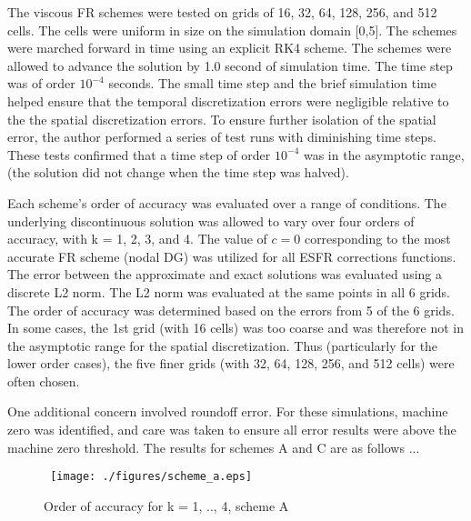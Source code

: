 \vspace{0.1 in}
\noindent The viscous FR schemes were tested on grids of 16, 32, 64, 128, 256, and 512 cells. The cells were uniform in size on the simulation domain [0,5]. The schemes were marched forward in time using an explicit RK4 scheme. The schemes were allowed to advance the solution by 1.0 second of simulation time. The time step was of order \begin{math} 10^{-4} \end{math} seconds. The small time step and the brief simulation time helped ensure that the temporal discretization errors were negligible relative to the the spatial discretization errors. To ensure further isolation of the spatial error, the author performed a series of test runs with diminishing time steps. These tests confirmed that a time step of order \begin{math} 10^{-4} \end{math} was in the asymptotic range, (the solution did not change when the time step was halved). 

\vspace{0.1 in}

\noindent Each scheme's order of accuracy was evaluated over a range of conditions. The underlying discontinuous solution was allowed to vary over four orders of accuracy, with k = 1, 2, 3, and 4. The value of $c=0$ corresponding to the most accurate FR scheme (nodal DG) was utilized for all ESFR corrections functions. The error between the approximate and exact solutions was evaluated using a discrete L2 norm. The L2 norm was evaluated at the same points in all 6 grids. The order of accuracy was determined based on the errors from 5 of the 6 grids. In some cases, the 1st grid (with 16 cells) was too coarse and was therefore not in the asymptotic range for the spatial discretization. Thus (particularly for the lower order cases), the five finer grids (with 32, 64, 128, 256, and 512 cells) were often chosen. 

\vspace{0.1 in}
\noindent One additional concern involved roundoff error. For these simulations, machine zero was identified, and care was taken to ensure all error results were above the machine zero threshold. The results for schemes A and C are as follows ...

\begin{figure} \tt
\centering
\texttt{[image: ./figures/scheme\_a.eps]} \\
\caption{Order of accuracy for k = 1, .., 4, scheme A}
\label{fig:a_scheme}
\end{figure}


